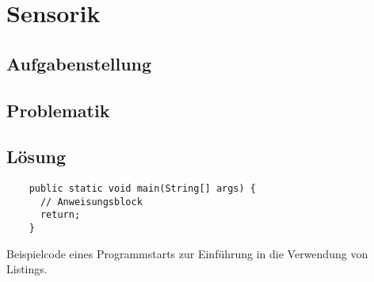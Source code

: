 \section{Sensorik}

\subsection{Aufgabenstellung}
\lipsum[2]

\subsection{Problematik}
\lipsum[3]

\subsection{Lösung}
\lipsum[4]

\begin{listing}
  \begin{verbatim}
    public static void main(String[] args) {
      // Anweisungsblock
      return;
    }
  \end{verbatim}
  \caption{Beispielcode eines Programmstarts zur Einführung in die Verwendung von Listings. }
  \label{lst:example}
\end{listing}

\lipsum[5]
